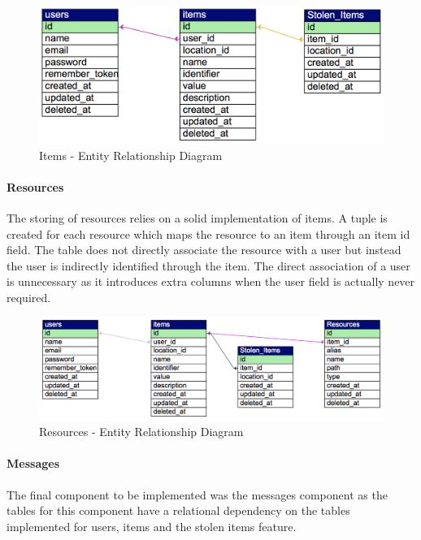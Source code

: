 \begin{figure}[H]
	\centering
	\includegraphics[width=1.0\textwidth]{images/Database/ERD_Items}
	\caption{Items - Entity Relationship Diagram} \label{fig:ERD_Items}
\end{figure}

\paragraph{Resources} The storing of resources relies on a solid implementation of items. A tuple is created for each resource which maps the resource to an item through an item id field. The table does not directly associate the resource with a user but instead the user is indirectly identified through the item. The direct association of a user is unnecessary as it introduces extra columns when the user field is actually never required. 

\begin{figure}[H]
	\centering
	\includegraphics[width=1.0\textwidth]{images/Database/ERD_Resources}
	\caption{Resources - Entity Relationship Diagram} \label{fig:ERD_Resources}
\end{figure}

\paragraph{Messages} The final component to be implemented was the messages component as the tables for this component have a relational dependency on the tables implemented for users, items and the stolen items feature.

